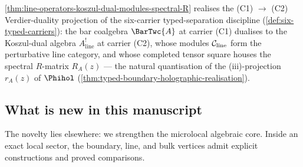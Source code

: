 \begin{remark}%
\label{rem:line-operators-as-C2-of-Phihol}%
%
\cref{thm:line-operators-koszul-dual-modules-spectral-R} realises the
\textup{(C1)} $\to$ \textup{(C2)} Verdier-duality projection of the
six-carrier typed-separation discipline
(\cref{def:six-typed-carriers}): the bar coalgebra $\BarTwc{A}$ at
carrier \textup{(C1)} dualises to the Koszul-dual algebra
$A^{!}_{\mathrm{line}}$ at carrier \textup{(C2)}, whose modules
$\mathcal C_{\mathrm{line}}$ form the perturbative line category, and whose
completed tensor square houses the spectral $R$-matrix $R_{A}(z)$ ---
the natural quantisation of the (iii)-projection $r_{A}(z)$ of
$\Phihol$ (\cref{thm:typed-boundary-holographic-realisation}).
\end{remark}

\subsection{What is new in this manuscript}

The novelty lies elsewhere: we strengthen the microlocal algebraic core. Inside an exact local sector, the boundary, line, and bulk vertices admit explicit constructions and proved comparisons.

